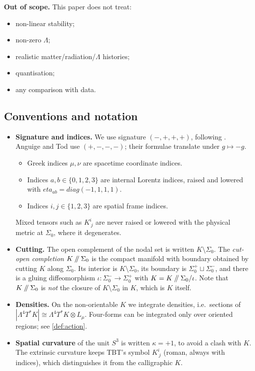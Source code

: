 \documentclass[11pt]{article}
\theoremstyle{canonmath}
\theoremstyle{canonpostulate}
\theoremstyle{canonproposition}
\theoremstyle{canonmath}
\theoremstyle{canonproposition}
\providecommand{\cutK}{\Klein\mathbin{/\mkern-5mu/}\Sigma_0}
\providecommand{\Lmu}{\mathcal{L}_\mu}
\providecommand{\Klein}{\mathcal{K}}
\def\mathrm#1{#1}%
\def\mathcal#1{#1}%
\def\eta{eta}%
\begin{document}
\textbf{Out of scope.} This paper does not treat:
\begin{itemize}
\item non-linear stability;
\item non-zero $\Lambda$;
\item realistic matter/radiation/$\Lambda$ histories;
\item quantisation;
\item any comparison with data.
\end{itemize}

\subsection{Conventions and notation}

\begin{itemize}
\item \textbf{Signature and indices.} We use signature $(-,+,+,+)$, following \cite{TBT2026}. Anguige and Tod \cite{AnguigeTod1999a} use $(+,-,-,-)$; their formulae translate under $g \mapsto -g$.
  \begin{itemize}
  \item Greek indices $\mu, \nu$ are spacetime coordinate indices.
  \item Indices $a, b \in \{0,1,2,3\}$ are internal Lorentz indices, raised and lowered with $\eta_{ab} = \mathrm{diag}(-1,1,1,1)$.
  \item Indices $i, j \in \{1,2,3\}$ are spatial frame indices.
  \end{itemize}
  Mixed tensors such as $K^i_{\ j}$ are never raised or lowered with the physical metric at $\Sigma_0$, where it degenerates.
\item \textbf{Cutting.} The open complement of the nodal set is written $\Klein \setminus \Sigma_0$. The \emph{cut-open completion} $\cutK$ is the compact manifold with boundary obtained by cutting $\Klein$ along $\Sigma_0$. Its interior is $\Klein\setminus\Sigma_0$, its boundary is $\Sigma_0^+ \sqcup \Sigma_0^-$, and there is a gluing diffeomorphism $\iota: \Sigma_0^- \to \Sigma_0^+$ with $\Klein = \cutK/\iota$. Note that $\cutK$ is \emph{not} the closure of $\Klein\setminus\Sigma_0$ in $\Klein$, which is $\Klein$ itself.
\item \textbf{Densities.} On the non-orientable $\Klein$ we integrate densities, i.e.\ sections of $|\Lambda^4 T^*\Klein| \cong \Lambda^4 T^*\Klein \otimes \Lmu$. Four-forms can be integrated only over oriented regions; see \cref{def:action}.
\item \textbf{Spatial curvature} of the unit $S^3$ is written $\kappa = +1$, to avoid a clash with $\Klein$. The extrinsic curvature keeps TBT's symbol $K^i_{\ j}$ (roman, always with indices), which distinguishes it from the calligraphic $\Klein$.

\end{itemize}
\end{document}
